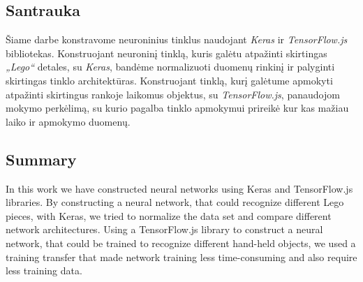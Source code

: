 \documentclass{VUMIFInfKursinis}
\begin{document}
\newpage

\subsection*{Santrauka}

Šiame darbe konstravome neuroninius tinklus naudojant \textit{Keras} ir \textit{TensorFlow.js} bibliotekas. Konstruojant neuroninį tinklą, kuris galėtu atpažinti skirtingas \textit{„Lego“} detales, su \textit{Keras}, bandėme normalizuoti duomenų rinkinį ir palyginti skirtingas tinklo architektūras. Konstruojant tinklą, kurį galėtume apmokyti atpažinti skirtingus rankoje laikomus objektus, su \textit{TensorFlow.js}, panaudojom mokymo perkėlimą, su kurio pagalba tinklo apmokymui prireikė kur kas mažiau laiko ir apmokymo duomenų.

\subsection*{Summary}

In this work we have constructed neural networks using Keras and TensorFlow.js libraries. By constructing a neural network, that could recognize different Lego pieces, with Keras, we tried to normalize the data set and compare different network architectures. Using a TensorFlow.js library to construct a neural network, that could be trained to recognize different hand-held objects, we used a training transfer that made network training less time-consuming and also require less training data.

\newpage


\end{document}
